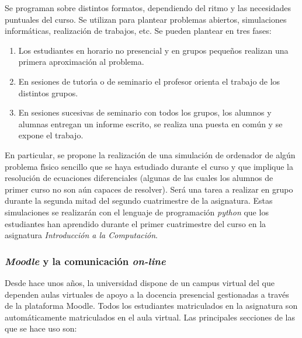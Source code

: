 Se  programan sobre distintos formatos, dependiendo del ritmo 
y las necesidades puntuales del curso. Se utilizan para 
 plantear problemas abiertos,
simulaciones inform\'{a}ticas, realizaci\'{o}n de trabajos, etc.
Se pueden plantear en tres fases:
\begin{enumerate}
\item Los estudiantes en horario no presencial y en grupos peque\~{n}os
realizan una primera aproximaci\'{o}n al problema.
\item En sesiones de tutor\'{\i}a o de seminario
el profesor orienta el trabajo de los distintos grupos.
\item En  sesiones sucesivas de seminario con todos los grupos,
 los alumnos  y alumnas
entregan un informe escrito, se realiza una puesta en com\'{u}n y 
se expone el trabajo.
\end{enumerate}

En particular, se propone la realizaci\'{o}n de una simulaci\'{o}n de ordenador
de alg\'{u}n problema f\'{\i}sico sencillo
 que se haya estudiado durante el curso y
 que implique la resoluci\'{o}n de ecuaciones diferenciales (algunas de 
las cuales los alumnos de primer curso no son a\'{u}n capaces de resolver).
Ser\'{a} una tarea a realizar en grupo durante la segunda mitad del 
segundo cuatrimestre de la asignatura.
Estas simulaciones se realizar\'{a}n con el lenguaje de programaci\'{o}n
{\it python} que los estudiantes han aprendido durante el primer
cuatrimestre del curso en la asignatura
 {\it Introducci\'{o}n a la Computaci\'{o}n}.



\subsubsection {\bf \emph{Moodle} y la comunicaci\'{o}n \emph{on-line} }

Desde hace unos a\~{n}os, la universidad dispone de un campus virtual 
del que dependen aulas virtuales de apoyo a la docencia presencial
 gestionadas a trav\'{e}s de la plataforma {\it } Moodle.
Todos los estudiantes matriculados en la asignatura son autom\'{a}ticamente
matriculados en el aula virtual. Las principales secciones de las que se 
hace uso son:

